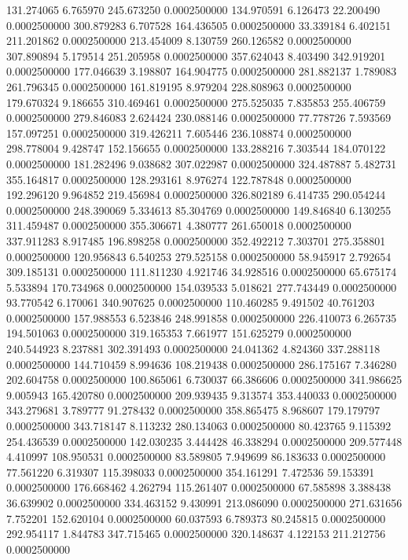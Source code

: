 131.274065 6.765970 245.673250 0.0002500000
134.970591 6.126473 22.200490 0.0002500000
300.879283 6.707528 164.436505 0.0002500000
33.339184 6.402151 211.201862 0.0002500000
213.454009 8.130759 260.126582 0.0002500000
307.890894 5.179514 251.205958 0.0002500000
357.624043 8.403490 342.919201 0.0002500000
177.046639 3.198807 164.904775 0.0002500000
281.882137 1.789083 261.796345 0.0002500000
161.819195 8.979204 228.808963 0.0002500000
179.670324 9.186655 310.469461 0.0002500000
275.525035 7.835853 255.406759 0.0002500000
279.846083 2.624424 230.088146 0.0002500000
77.778726 7.593569 157.097251 0.0002500000
319.426211 7.605446 236.108874 0.0002500000
298.778004 9.428747 152.156655 0.0002500000
133.288216 7.303544 184.070122 0.0002500000
181.282496 9.038682 307.022987 0.0002500000
324.487887 5.482731 355.164817 0.0002500000
128.293161 8.976274 122.787848 0.0002500000
192.296120 9.964852 219.456984 0.0002500000
326.802189 6.414735 290.054244 0.0002500000
248.390069 5.334613 85.304769 0.0002500000
149.846840 6.130255 311.459487 0.0002500000
355.306671 4.380777 261.650018 0.0002500000
337.911283 8.917485 196.898258 0.0002500000
352.492212 7.303701 275.358801 0.0002500000
120.956843 6.540253 279.525158 0.0002500000
58.945917 2.792654 309.185131 0.0002500000
111.811230 4.921746 34.928516 0.0002500000
65.675174 5.533894 170.734968 0.0002500000
154.039533 5.018621 277.743449 0.0002500000
93.770542 6.170061 340.907625 0.0002500000
110.460285 9.491502 40.761203 0.0002500000
157.988553 6.523846 248.991858 0.0002500000
226.410073 6.265735 194.501063 0.0002500000
319.165353 7.661977 151.625279 0.0002500000
240.544923 8.237881 302.391493 0.0002500000
24.041362 4.824360 337.288118 0.0002500000
144.710459 8.994636 108.219438 0.0002500000
286.175167 7.346280 202.604758 0.0002500000
100.865061 6.730037 66.386606 0.0002500000
341.986625 9.005943 165.420780 0.0002500000
209.939435 9.313574 353.440033 0.0002500000
343.279681 3.789777 91.278432 0.0002500000
358.865475 8.968607 179.179797 0.0002500000
343.718147 8.113232 280.134063 0.0002500000
80.423765 9.115392 254.436539 0.0002500000
142.030235 3.444428 46.338294 0.0002500000
209.577448 4.410997 108.950531 0.0002500000
83.589805 7.949699 86.183633 0.0002500000
77.561220 6.319307 115.398033 0.0002500000
354.161291 7.472536 59.153391 0.0002500000
176.668462 4.262794 115.261407 0.0002500000
67.585898 3.388438 36.639902 0.0002500000
334.463152 9.430991 213.086090 0.0002500000
271.631656 7.752201 152.620104 0.0002500000
60.037593 6.789373 80.245815 0.0002500000
292.954117 1.844783 347.715465 0.0002500000
320.148637 4.122153 211.212756 0.0002500000
